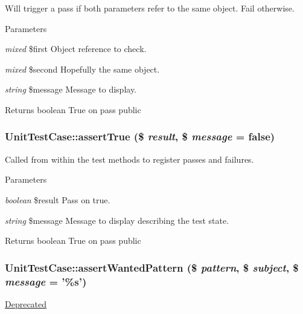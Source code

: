 \label{class_unit_test_case_a14a8294747390eb7ce1238d0fb00d5f1}
Will trigger a pass if both parameters refer to the same object. Fail otherwise. 
\begin{DoxyParams}{Parameters}
\item[{\em mixed}]\$first Object reference to check. \item[{\em mixed}]\$second Hopefully the same object. \item[{\em string}]\$message Message to display. \end{DoxyParams}
\begin{DoxyReturn}{Returns}
boolean True on pass  public 
\end{DoxyReturn}
\hypertarget{class_unit_test_case_a0dfaf4fc311df202de45e0c26919de3f}{
\subsubsection[{assertTrue}]{\setlength{\rightskip}{0pt plus 5cm}UnitTestCase::assertTrue (\$ {\em result}, \/  \$ {\em message} = {\ttfamily false})}}
\label{class_unit_test_case_a0dfaf4fc311df202de45e0c26919de3f}
Called from within the test methods to register passes and failures. 
\begin{DoxyParams}{Parameters}
\item[{\em boolean}]\$result Pass on true. \item[{\em string}]\$message Message to display describing the test state. \end{DoxyParams}
\begin{DoxyReturn}{Returns}
boolean True on pass  public 
\end{DoxyReturn}
\hypertarget{class_unit_test_case_af90c866edd54a7db648e9e1e95043209}{
\subsubsection[{assertWantedPattern}]{\setlength{\rightskip}{0pt plus 5cm}UnitTestCase::assertWantedPattern (\$ {\em pattern}, \/  \$ {\em subject}, \/  \$ {\em message} = {\ttfamily '\%s'})}}
\label{class_unit_test_case_af90c866edd54a7db648e9e1e95043209}
\begin{Desc}
\item[\hyperlink{deprecated__deprecated000018}{Deprecated}]\end{Desc}
